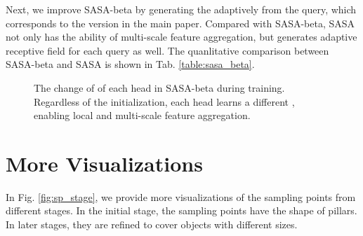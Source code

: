 \documentclass[10pt,twocolumn,letterpaper]{article}
\begin{document}
Next, we improve SASA-beta by generating the  adaptively from the query, which corresponds to the version in the main paper. Compared with SASA-beta, SASA not only has the ability of multi-scale feature aggregation, but generates adaptive receptive field for each query as well. The quanlitative comparison between SASA-beta and SASA is shown in Tab. \ref{table:sasa_beta}.

\begin{figure}[t]
  \centering
  \hfill
  \vspace{-5pt}
  \caption{The change of  of each head in SASA-beta during training. Regardless of the initialization, each head learns a different , enabling local and multi-scale feature aggregation.}
  \label{fig:sasa_tau_training}
\end{figure}

\section{More Visualizations}

In Fig. \ref{fig:sp_stage}, we provide more visualizations of the sampling points from different stages. In the initial stage, the sampling points have the shape of pillars. In later stages, they are refined to cover objects with different sizes.

\begin{figure*}
  \centering

  \vspace{5pt}
  \vspace{5pt}
  \vspace{15pt}
  \vspace{5pt}
  \vspace{5pt}

  \caption{Visualized sampling points from different stages. Different instances are distinguished by colors.}
  \vspace{-5pt}
  \label{fig:sp_stage}
\end{figure*}
\end{document}
